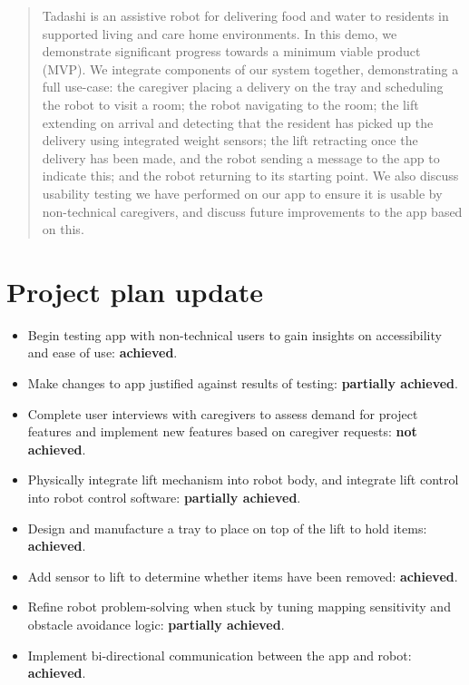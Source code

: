 \documentclass{article}
\begin{document}
 



\begin{abstract}
  Tadashi is an assistive robot for delivering food and water to residents in supported living and care home environments.
  In this demo, we demonstrate significant progress towards a minimum viable product (MVP). We integrate components of our system together, demonstrating a full use-case: the caregiver placing a delivery on the tray and scheduling the robot to visit a room; the robot navigating to the room; the lift extending on arrival and detecting that the resident has picked up the delivery using integrated weight sensors; the lift retracting once the delivery has been made, and the robot sending a message to the app to indicate this; and the robot returning to its starting point. We also discuss usability testing we have performed on our app to ensure it is usable by non-technical caregivers, and discuss future improvements to the app based on this. 
\end{abstract} 

\section{Project plan update} 
\begin{itemize}
\item Begin testing app with non-technical users to gain insights on accessibility and ease of use: {\bf achieved}.
\item Make changes to app justified against results of testing: {\bf partially achieved}.
\item Complete user interviews with caregivers to assess demand for project features and implement new features based on caregiver requests: {\bf not achieved}.
\item Physically integrate lift mechanism into robot body, and integrate lift control into robot control software: {\bf partially achieved}.
\item Design and manufacture a tray to place on top of the lift to hold items: {\bf achieved}.
\item Add sensor to lift to determine whether items have been removed: {\bf achieved}.
\item Refine robot problem-solving when stuck by tuning mapping sensitivity and obstacle avoidance logic: {\bf partially achieved}. 
\item Implement bi-directional communication between the app and robot: {\bf achieved}.
\end{itemize}
\end{document}

